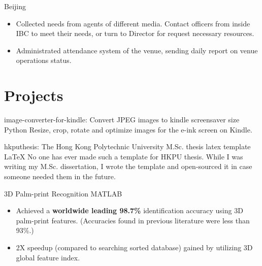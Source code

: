 \documentclass[11pt,a4paper]{moderncv/moderncv}
\begin{document}
{Beijing}{}
{
\begin{itemize}
	\item Collected needs from agents of different media. Contact officers from inside IBC to meet their needs, or turn to Director for request necessary resources.
	\item Administrated attendance system of the venue, sending daily report on venue operations status.
\end{itemize}
}


\section{Projects}

{image-converter-for-kindle: Convert JPEG images to kindle screensaver size}
{Python}
{}{}
{
Resize, crop, rotate and optimize images for the e-ink screen on Kindle.
}

%
{hkputhesis: The Hong Kong Polytechnic University M.Sc. thesis latex template}
{LaTeX}
{}{}
{
No one has ever made such a template for HKPU thesis. While I was writing my M.Sc. dissertation, I wrote the template and open-sourced it in case someone needed them in the future.
}

{3D Palm-print Recognition}
{MATLAB}
{}{}
{
\begin{itemize}
	\item Achieved a \textbf{worldwide leading 98.7\%} identification accuracy using 3D palm-print features. (Accuracies found in previous literature were less than 93\%.)
	\item 2X speedup (compared to searching sorted database) gained by utilizing 3D global feature index.
\end{itemize}
}
\end{document}
